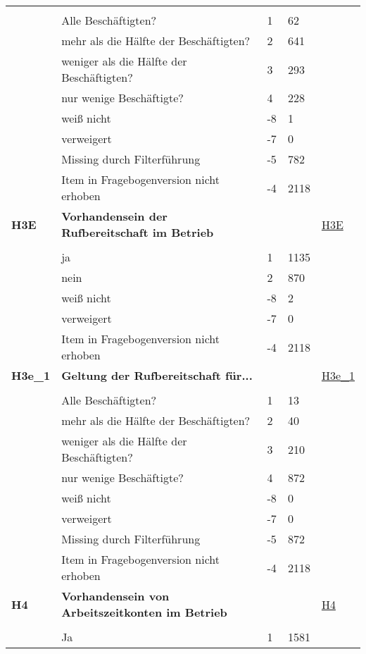 \begin{longtable}{| L{2.5cm} | L{8.25cm}| C{1.5cm} | R{1.25cm} | C{2.25cm} |  }
   &  &  &  &  \\ 
   & Alle Beschäftigten? & 1 & 62 &  \\ 
   & mehr als die Hälfte der Beschäftigten? & 2 & 641 &  \\ 
   & weniger als die Hälfte der Beschäftigten? & 3 & 293 &  \\ 
   & nur wenige Beschäftigte? & 4 & 228 &  \\ 
   & weiß nicht & -8 & 1 &  \\ 
   & verweigert & -7 & 0 &  \\ 
   & Missing durch Filterführung & -5 & 782 &  \\ 
   & Item in Fragebogenversion nicht erhoben & -4 & 2118 &  \\ 
   \midrule
\textbf{H3E}\label{var:suf:H3E} & \textbf{Vorhandensein der Rufbereitschaft im Betrieb} &  &  & \hyperref[H3E]{H3E} \\ 
   &  &  &  &  \\ 
   & ja & 1 & 1135 &  \\ 
   & nein & 2 & 870 &  \\ 
   & weiß nicht & -8 & 2 &  \\ 
   & verweigert & -7 & 0 &  \\ 
   & Item in Fragebogenversion nicht erhoben & -4 & 2118 &  \\ 
   \midrule
\textbf{H3e\_1}\label{var:suf:H3e:1} & \textbf{Geltung der Rufbereitschaft für...} &  &  & \hyperref[H3e:1]{H3e\_1} \\ 
   &  &  &  &  \\ 
   & Alle Beschäftigten? & 1 & 13 &  \\ 
   & mehr als die Hälfte der Beschäftigten? & 2 & 40 &  \\ 
   & weniger als die Hälfte der Beschäftigten? & 3 & 210 &  \\ 
   & nur wenige Beschäftigte? & 4 & 872 &  \\ 
   & weiß nicht & -8 & 0 &  \\ 
   & verweigert & -7 & 0 &  \\ 
   & Missing durch Filterführung & -5 & 872 &  \\ 
   & Item in Fragebogenversion nicht erhoben & -4 & 2118 &  \\ 
   \midrule
\textbf{H4}\label{var:suf:H4} & \textbf{Vorhandensein von Arbeitszeitkonten im Betrieb} &  &  & \hyperref[H4]{H4} \\ 
   &  &  &  &  \\ 
   & Ja & 1 & 1581 &  \\ 

\end{longtable}

